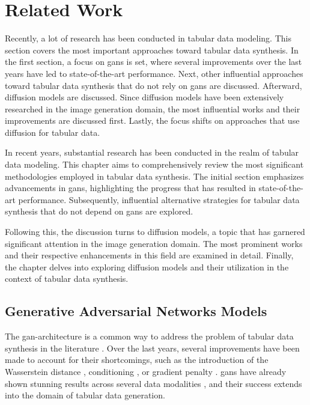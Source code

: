 \chapter{Related Work}
\label{ch:relatedWork}

Recently, a lot of research has been conducted in tabular data modeling.
This section covers the most important approaches toward tabular data synthesis.
In the first section, a focus on \glspl{gan} is set, where several improvements over the last years have led to state-of-the-art performance.
Next, other influential approaches toward tabular data synthesis that do not rely on \glspl{gan} are discussed.
Afterward, diffusion models are discussed.
Since diffusion models have been extensively researched in the image generation domain, the most influential works and their improvements are discussed first.
Lastly, the focus shifts on approaches that use diffusion for tabular data.

In recent years, substantial research has been conducted in the realm of tabular data modeling. 
This chapter aims to comprehensively review the most significant methodologies employed in tabular data synthesis. 
The initial section emphasizes advancements in \glspl{gan}, highlighting the progress that has resulted in state-of-the-art performance. 
Subsequently, influential alternative strategies for tabular data synthesis that do not depend on \glspl{gan} are explored.

Following this, the discussion turns to diffusion models, a topic that has garnered significant attention in the image generation domain. 
The most prominent works and their respective enhancements in this field are examined in detail.
Finally, the chapter delves into exploring diffusion models and their utilization in the context of tabular data synthesis.

\section{Generative Adversarial Networks Models}
\label{ch:relatedWork-generativeAdversarialNetworksModels}

The \gls{gan}-architecture is a common way to address the problem of tabular data synthesis in the literature \cite{borisov2022DeepNeuralNetworks}.
Over the last years, several improvements have been made to account for their shortcomings, such as the introduction of the Wasserstein \cite{frogner2015LearningWassersteinLoss} distance \cite{arjovsky2017WassersteinGenerativeAdversarial}, conditioning \cite{mirza2014ConditionalGenerativeAdversarial}, or gradient penalty \cite{gulrajani2017ImprovedTrainingWasserstein}.
\Glspl{gan} have already shown stunning results across several data modalities \cite{mckeever2020SynthesisingTabularDatasets}, and their success extends into the domain of tabular data generation.


